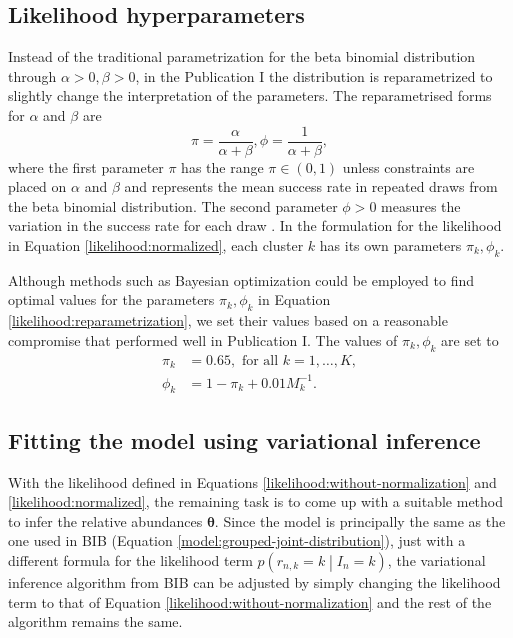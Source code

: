 \documentclass[officiallayout]{tktla}
\begin{document}
\subsection{Likelihood hyperparameters}

Instead of the traditional parametrization for the beta binomial
distribution through $\alpha >0, \beta > 0$, in the Publication I the
distribution is reparametrized to slightly change the interpretation
of the parameters. The reparametrised forms for $\alpha$ and $\beta$ are
\begin{equation}
  \label{likelihood:reparametrization}
  \pi = \frac{\alpha}{\alpha + \beta}, \phi = \frac{1}{\alpha + \beta},
\end{equation}
where the first parameter $\pi$ has the range $\pi \in \left(0,
1\right)$ unless constraints are placed on $\alpha$ and $\beta$ and
represents the mean success rate in repeated draws from the beta
binomial distribution. The second parameter $\phi > 0$ measures
the variation in the success rate for each draw
\citep{griffiths1973maximum}. In the formulation for the likelihood in
Equation \eqref{likelihood:normalized}, each cluster $k$ has its own
parameters $\pi_{k}, \phi_{k}$.

Although methods such as Bayesian optimization \citep{movckus1975bayesian} could
be employed to find optimal values for the parameters $\pi_{k},
\phi_{k}$ in Equation \eqref{likelihood:reparametrization}, we set
their values based on a reasonable compromise that performed well in
Publication I. The values of $\pi_{k}, \phi_{k}$ are set to
\begin{equation}
  \begin{aligned}
    \pi_k &= 0.65, \text{ for all } k = 1, \dots, K, \\
    \phi_{k} &= 1 - \pi_{k} + 0.01M_{k}^{-1}.
  \end{aligned}
\end{equation}

\subsection{Fitting the model using variational inference}

With the likelihood defined in Equations
\eqref{likelihood:without-normalization} and
\eqref{likelihood:normalized}, the remaining task is to come up with a
suitable method to infer the relative abundances
$\boldsymbol\theta$. Since the model is principally the same as the
one used in BIB (Equation \eqref{model:grouped-joint-distribution}),
just with a different formula for the likelihood term $p\left(r_{n, k}
= k \middle| I_{n} = k\right)$, the variational inference algorithm
from BIB can be adjusted by simply changing the likelihood term to
that of Equation \eqref{likelihood:without-normalization} and the rest of
the algorithm remains the same.
\end{document}

